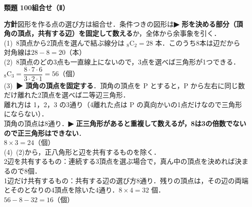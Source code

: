 \documentclass[a4paper,11pt]{ltjsarticle}
\newcommand{\ans}[2]{\Needspace{5\baselineskip}\vspace{6pt}%
  {\sffamily\bfseries 類題 #1\quad #2}\par}
\newcommand{\point}[1]{\textsf{\bfseries ▶ #1}}
\begin{document}
\ans{100}{組合せ（Ⅱ）}
\begin{kai}
\textbf{方針}\quad 図形を作る点の選び方は組合せ．条件つきの図形は\point{形を決める部分（頂角の頂点，共有する辺）を固定して数える}か，全体から余事象を引く．\\[2pt]
(1)\ 8頂点から2頂点を選んで結ぶ線分は ${}_8\mathrm C_2=28$ 本．このうち8本は辺だから\\
\hspace*{1.5em}対角線は\quad $28-8=20$（本）\\[2pt]
(2)\ 8頂点のどの3点も一直線上にないので，3点を選べば三角形が1つできる．\\
\hspace*{1.5em}${}_8\mathrm C_3=\dfrac{8\cdot7\cdot6}{3\cdot2\cdot1}=56$（個）\\[2pt]
(3)\ \point{頂角の頂点を固定する}．頂角の頂点を P とすると，P から左右に同じ数だけ離れた2頂点を選べば二等辺三角形．\\
\hspace*{1.5em}離れ方は 1，2，3 の3通り（4離れた点は P の真向かいの1点だけなので三角形にならない）．\\
\hspace*{1.5em}頂角の頂点は8通り．\point{正三角形があると重複して数えるが，8は3の倍数でないので正三角形はできない}．\\
\hspace*{1.5em}$8\times3=24$（個）\\[2pt]
(4)\ (2)から，正八角形と辺を共有するものを除く．\\
\hspace*{1.5em}2辺を共有するもの：連続する3頂点を選ぶ場合で，真ん中の頂点を決めれば決まるので8個．\\
\hspace*{1.5em}1辺だけ共有するもの：共有する辺の選び方8通り．残りの頂点は，その辺の両端とそのとなりの4頂点を除いた4通り．$8\times4=32$ 個．\\
\hspace*{1.5em}$56-8-32=16$（個）
\end{kai}
\end{document}
